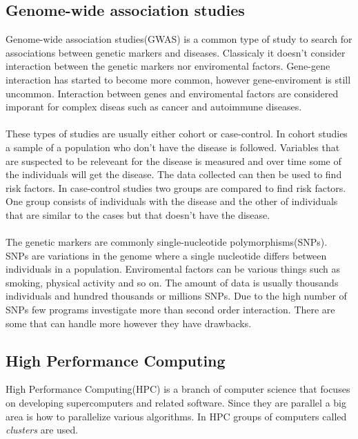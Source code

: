 \documentclass[10pt,a4paper]{article}
\begin{document}
\subsection{Genome-wide association studies}
Genome-wide association studies(GWAS) is a common type of study to search for associations between genetic markers and diseases. Classicaly it doesn't consider interaction between the genetic markers nor enviromental factors. Gene-gene interaction has started to become more common\cite{cordell_detect_review}, however gene-enviroment is still uncommon\cite{gene_enviroment_2013}. Interaction between genes and enviromental factors are considered imporant for complex diseas such as cancer and autoimmune diseases.\cite{cordell_detect_review, gene_enviroment_2013, geira, ra_smoking}\\
\\
These types of studies are usually either cohort or case-control. In cohort studies a sample of a population who don't have the disease is followed. Variables that are suspected to be releveant for the disease is measured and over time some of the individuals will get the disease. The data collected can then be used to find risk factors. In case-control studies two groups are compared to find risk factors. One group consists of individuals with the disease and the other of individuals that are similar to the cases but that doesn't have the disease.\cite{rothman1998modern,mann_observational}\\
\\
The genetic markers are commonly single-nucleotide polymorphisms(SNPs). SNPs are variations in the genome where a single nucleotide differs between individuals in a population\cite{fareed_snp}. Enviromental factors can be various things such as smoking, physical activity and so on. The amount of data is usually thousands individuals and hundred thousands or millions SNPs. Due to the high number of SNPs few programs investigate more than second order interaction. There are some that can handle more however they have drawbacks\cite{gwis,high_order_2012,fast_high_order_cluster}.

\subsection{High Performance Computing}
High Performance Computing(HPC) is a branch of computer science that focuses on developing supercomputers and related software. Since they are parallel a big area is how to parallelize various algorithms. In HPC groups of computers called \emph{clusters} are used.\cite{intro_hpc, introduction_hpc_hager}
\end{document}
